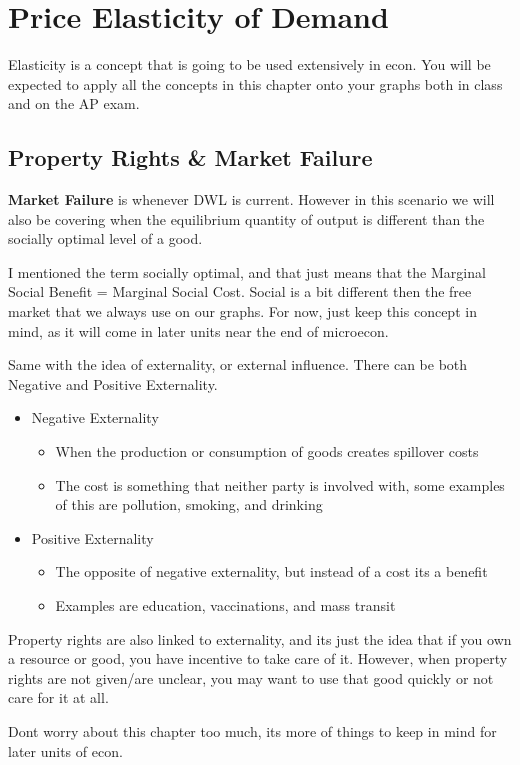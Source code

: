 \newpage
\chapter{\normalfont Price Elasticity of Demand}
Elasticity is a concept that is going to be used extensively in econ. You will be expected to apply all the concepts in this chapter onto your graphs both in class and on the AP exam. 
\section{Property Rights \& Market Failure}
\begin{definition}
    \textbf{Market Failure} is whenever DWL is current. However in this scenario we will also be covering when the equilibrium quantity of output is different than the socially optimal level of a good. 
\end{definition}

I mentioned the term socially optimal, and that just means that the Marginal Social Benefit = Marginal Social Cost. Social is a bit different then the free market that we always use on our graphs. For now, just keep this concept in mind, as it will come in later units near the end of microecon.

Same with the idea of externality, or external influence. There can be both Negative and Positive Externality. 
\begin{itemize}
    \item Negative Externality
        \begin{itemize}
            \item When the production or consumption of goods creates spillover costs
            \item The cost is something that neither party is involved with, some examples of this are pollution, smoking, and drinking
        \end{itemize}
    \item Positive Externality
        \begin{itemize}
            \item The opposite of negative externality, but instead of a cost its a benefit
            \item Examples are education, vaccinations, and mass transit
        \end{itemize}
\end{itemize}

Property rights are also linked to externality, and its just the idea that if you own a resource or good, you have incentive to take care of it. However, when property rights are not given/are unclear, you may want to use that good quickly or not care for it at all. 

Dont worry about this chapter too much, its more of things to keep in mind for later units of econ. 
